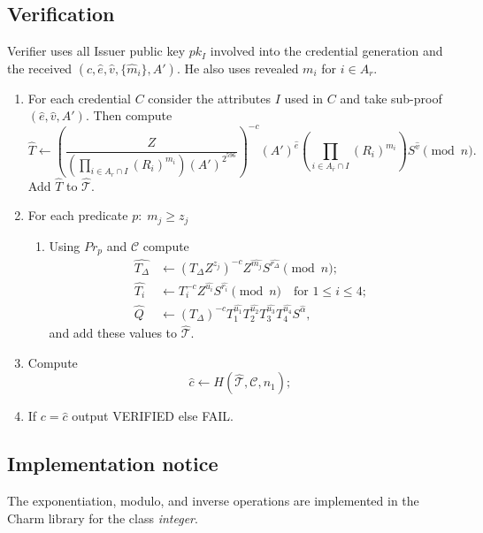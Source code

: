 \documentclass[a4paper]{article}
\begin{document}
\subsection{Verification}
Verifier uses all Issuer public key $pk_I$ involved into the credential generation and  the received $(c,\widehat{e},\widehat{v},\{\widehat{m}_i\},A')$. He also uses revealed 
$m_i$ for $i\in A_r$.

\begin{enumerate}
\item For each credential $C$ consider the  attributes $I$ used in $C$ and take sub-proof $(\widehat{e},\widehat{v},A')$. Then compute 
\begin{equation}\label{eq:that}
 \widehat{T} \leftarrow \left(
    \frac{Z}
    { \left(
        \prod_{i \in A_r\cap I}(R_i)^{m_i}
    \right)
    (A')^{2^{596}}
    }\right)^{-c}
    (A')^{\widehat{e}}
    \left(\prod_{i\in A_{\overline{r}}\cap I}(R_i)^{\widehat{m_i}}\right)
    S^{\widehat{v}}\pmod{n}.
\end{equation}
Add $\widehat{T}$ to $\widehat{\mathcal{T}}$.
\item For each predicate $p:\;m_j\geq z_j$
\begin{enumerate}
\item Using $Pr_p$ and $\mathcal{C}$ compute 
\begin{align}
\widehat{T_{\Delta}} &\leftarrow \left(T_{\Delta}Z^{z_j}\right)^{-c}Z^{\widehat{m_j}}S^{\widehat{r_{\Delta}}}\pmod{n};\\
\widehat{T_i} &\leftarrow T_i^{-c}Z^{\widehat{u_i}} S^{\widehat{r_i}}\pmod{n} \quad \text{for }1\leq i \leq 4;\\
\widehat{Q}&\leftarrow (T_{\Delta})^{-c}T_1^{\widehat{u_1}}T_2^{\widehat{u_2}}T_3^{\widehat{u_3}}T_4^{\widehat{u_4}}
S^{\widehat{\alpha}},
\end{align}
and add these values to  $\widehat{\mathcal{T}}$.
\end{enumerate}
\item Compute $$
\widehat{c} \leftarrow H(\widehat{\mathcal{T}},\mathcal{C},n_1);
$$
\item If $c=\widehat{c}$ output VERIFIED else FAIL.
\end{enumerate}

\subsection{Implementation notice}
The exponentiation, modulo, and inverse operations are implemented in the Charm library for the class \textsl{integer}.
\end{document}
